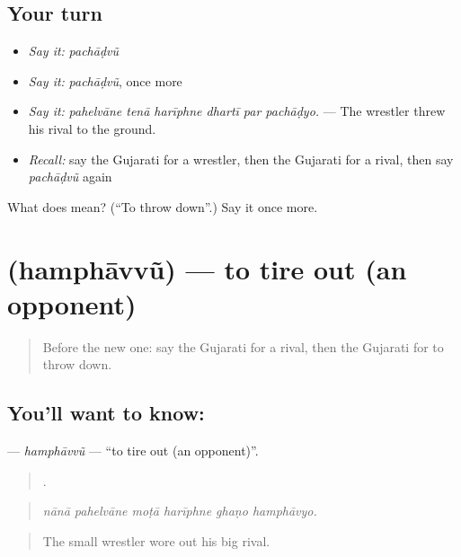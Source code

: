 \subsection*{Your turn}
\begin{itemize}
\raggedright
  \item \emph{Say it:} \emph{pachāḍvũ}
  \item \emph{Say it:} \emph{pachāḍvũ}, once more
  \item \emph{Say it:} \emph{pahelvāne tenā harīphne dhartī par pachāḍyo.} — The wrestler threw his rival to the ground.
  \item \emph{Recall:} say the Gujarati for a wrestler, then the Gujarati for a rival, then say \emph{pachāḍvũ} again
\end{itemize}

\begin{tcolorbox}[breakable,colback=teal!4,colframe=teal!35!black,title={Before you move on}]
What does  mean? (\textquotedblleft{}To throw down\textquotedblright{}.) Say it once more.
\end{tcolorbox}
\section[\texorpdfstring{\gu{હંફાવવું} (hamphāvvũ)}{હંફાવવું (hamphāvvũ)}]{ (hamphāvvũ) — to tire out (an opponent)}

\label{lesson:GU-C527-hamphavvu}



\begin{quote}
Before the new one: say the Gujarati for a rival, then the Gujarati for to throw down.
\end{quote}

\subsection*{You'll want to know: }
\textbf{} — \emph{hamphāvvũ} — \textquotedblleft{}to tire out (an opponent)\textquotedblright{}.

\begin{quote}
     .
\end{quote}

\begin{quote}
\emph{nānā pahelvāne moṭā harīphne ghaṇo hamphāvyo.}
\end{quote}

\begin{quote}
The small wrestler wore out his big rival.
\end{quote}

